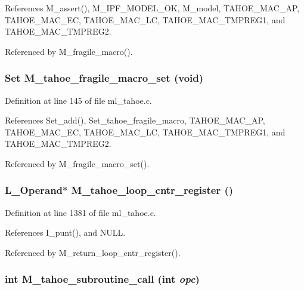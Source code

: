 References M\_\-assert(), M\_\-IPF\_\-MODEL\_\-OK, M\_\-model, TAHOE\_\-MAC\_\-AP, TAHOE\_\-MAC\_\-EC, TAHOE\_\-MAC\_\-LC, TAHOE\_\-MAC\_\-TMPREG1, and TAHOE\_\-MAC\_\-TMPREG2.

Referenced by M\_\-fragile\_\-macro().
\subsubsection{\setlength{\rightskip}{0pt plus 5cm}\bf{Set} M\_\-tahoe\_\-fragile\_\-macro\_\-set (void)}\label{ml__tahoe_8c_045f863fbc9ff1d585ce675a3b783ab0}




Definition at line 145 of file ml\_\-tahoe.c.

References Set\_\-add(), Set\_\-tahoe\_\-fragile\_\-macro, TAHOE\_\-MAC\_\-AP, TAHOE\_\-MAC\_\-EC, TAHOE\_\-MAC\_\-LC, TAHOE\_\-MAC\_\-TMPREG1, and TAHOE\_\-MAC\_\-TMPREG2.

Referenced by M\_\-fragile\_\-macro\_\-set().
\subsubsection{\setlength{\rightskip}{0pt plus 5cm}L\_\-Operand$\ast$ M\_\-tahoe\_\-loop\_\-cntr\_\-register ()}\label{ml__tahoe_8c_995bf451818848ba6a77c36985d49bba}




Definition at line 1381 of file ml\_\-tahoe.c.

References I\_\-punt(), and NULL.

Referenced by M\_\-return\_\-loop\_\-cntr\_\-register().
\subsubsection{\setlength{\rightskip}{0pt plus 5cm}int M\_\-tahoe\_\-subroutine\_\-call (int {\em opc})}\label{ml__tahoe_8c_792bddf43297fd172fb0ffc8b4982e5f}




